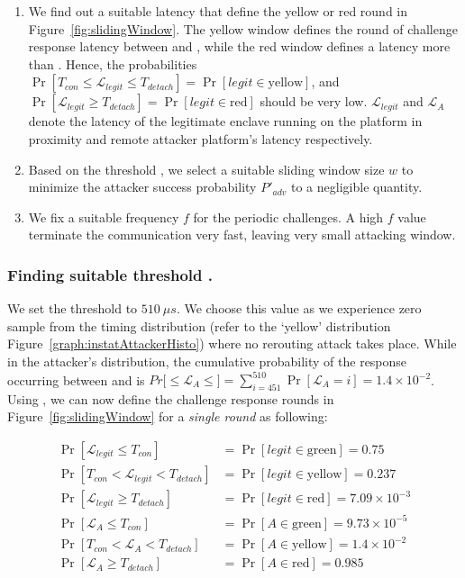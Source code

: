 \begin{enumerate}
  \item We find out a suitable latency \detach that define the yellow or red round in Figure~\ref{fig:slidingWindow}. The yellow window defines the round of challenge response latency between \connect and \detach, while the red window defines a latency more than \detach. Hence, the probabilities $\Pr[T_{con}\leq \mathcal{L}_{legit}\leq T_{detach}]=\Pr[legit\in\text{yellow}]$, and $\Pr[\mathcal{L}_{legit} \geq T_{detach}]=\Pr[legit\in\text{red}]$ should be very low. $\mathcal{L}_{legit}$ and $\mathcal{L}_{A}$ denote the latency of the legitimate enclave running on the platform in proximity and remote attacker platform's latency respectively.
  \item Based on the threshold \detach, we select a suitable sliding window size $w$ to minimize the attacker success probability $P'_{adv}$ to a negligible quantity.
  \item We fix a suitable frequency $f$ for the periodic challenges. A high $f$ value terminate the communication very fast, leaving very small attacking window.
\end{enumerate}

\subsubsection{Finding suitable threshold \detach.} We set the threshold \detach to $510\ \mu s$. We choose this value as we experience zero sample from the timing distribution (refer to the `yellow' distribution Figure~\ref{graph:instatAttackerHisto}) where no rerouting attack takes place. While in the attacker's distribution, the cumulative probability of the response occurring between \connect and \detach is $Pr[$\connect$\leq \mathcal{L}_{A} \leq$\detach$]=\sum_{i=451}^{510}\Pr[\mathcal{L}_{A}=i]=1.4\times10^{-2}$. 
Using \detach, we can now define the challenge response rounds in Figure~\ref{fig:slidingWindow} for a \emph{single round} as following:

\begin{align*}
\Pr[\mathcal{L}_{legit}\leq T_{con}]&=\Pr[legit\in\text{green}]=0.75\\
\Pr[T_{con}< \mathcal{L}_{legit}< T_{detach}]&=\Pr[legit\in\text{yellow}]= 0.237\\
\Pr[\mathcal{L}_{legit}\geq T_{detach}]&=\Pr[legit\in\text{red}]= 7.09\times10^{-3}\\
\Pr[\mathcal{L}_{A}\leq T_{con}]&=\Pr[A\in\text{green}]=9.73\times10^{-5}\\
\Pr[T_{con}< \mathcal{L}_{A}< T_{detach}]&=\Pr[A\in\text{yellow}]= 1.4\times10^{-2}\\
\Pr[\mathcal{L}_{A}\geq T_{detach}]&=\Pr[A\in\text{red}]= 0.985\\
\end{align*} 


